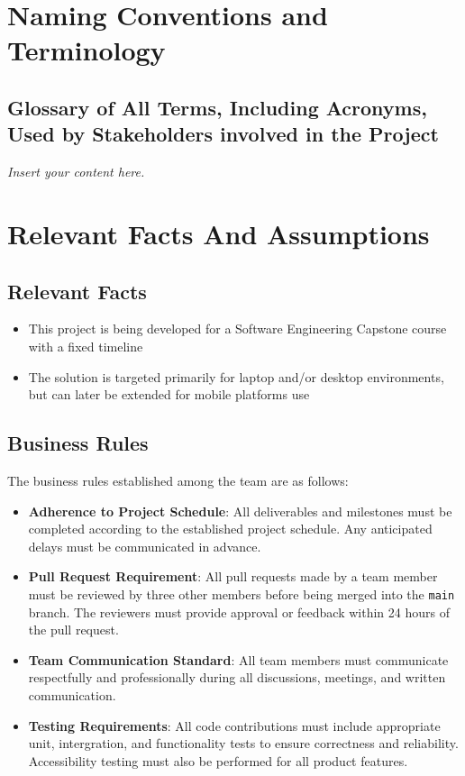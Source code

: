 \documentclass[12pt]{article}
\newcommand{\lips}{\textit{Insert your content here.}}
\begin{document}
\section{Naming Conventions and Terminology}
\subsection{Glossary of All Terms, Including Acronyms, Used by Stakeholders
involved in the Project}
\lips

\section{Relevant Facts And Assumptions}
\subsection{Relevant Facts}
\begin{itemize}
  \item This project is being developed for a Software Engineering Capstone course with a fixed timeline
  \item The solution is targeted primarily for laptop and/or desktop environments, but can later be extended for mobile platforms use
\end{itemize}
\subsection{Business Rules}
The business rules established among the team are as follows: 
\begin{itemize}
  \item \textbf{Adherence to Project Schedule}: All deliverables and milestones must be 
  completed according to the established project schedule. Any anticipated delays must be communicated
  in advance.
  \item \textbf{Pull Request Requirement}: All pull requests made by a team member must be reviewed by 
  three other members before being merged into the \texttt{main} branch. The reviewers must provide approval
  or feedback within 24 hours of the pull request.
  \item \textbf{Team Communication Standard}: All team members must communicate respectfully and professionally during 
  all discussions, meetings, and written communication. 
  \item \textbf{Testing Requirements}: All code contributions must include appropriate unit, intergration, and 
  functionality tests to ensure correctness and reliability. Accessibility testing must also be performed for all
  product features. 
\end{itemize}
\end{document}

